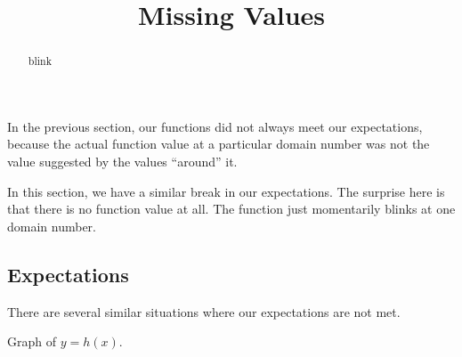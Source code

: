 \documentclass{ximera}
\title{Missing Values}
\begin{document}
\begin{abstract}
blink
\end{abstract}
\maketitle







In the previous section, our functions did not always meet our expectations, because the actual function value at a particular domain number was not the value suggested by the values ``around'' it.



In this section, we have a similar break in our expectations. The surprise here is that there is no function value at all. The function just momentarily blinks at one domain number.



























\subsection*{Expectations}

There are several similar situations where our expectations are not met.









Graph of $y = h(x)$.
\end{document}
